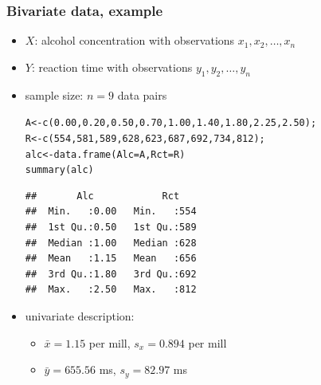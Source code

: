 \documentclass[extsize,handout,10pt]{beamer}\usepackage[]{graphicx}\usepackage[]{color}
\makeatletter
\newcommand{\hlnum}[1]{\textcolor[rgb]{0.502,0.086,1}{#1}}%
\newcommand{\hlstd}[1]{\textcolor[rgb]{0.251,0.251,0.251}{#1}}%
\newcommand{\hlkwb}[1]{\textcolor[rgb]{0,0.439,0.902}{#1}}%
\newcommand{\hlkwc}[1]{\textcolor[rgb]{0.188,0.941,0.314}{#1}}%
\newcommand{\hlkwd}[1]{\textcolor[rgb]{0.69,0.188,0.941}{#1}}%
\newenvironment{kframe}{%
 \def\at@end@of@kframe{}%
 \ifinner\ifhmode%
  \def\at@end@of@kframe{\end{minipage}}%
  \begin{minipage}{\columnwidth}%
 \fi\fi%
 \def\FrameCommand##1{\hskip\@totalleftmargin \hskip-\fboxsep
 \colorbox{shadecolor}{##1}\hskip-\fboxsep
     \hskip-\linewidth \hskip-\@totalleftmargin \hskip\columnwidth}%
 \MakeFramed {\advance\hsize-\width
   \@totalleftmargin\z@ \linewidth\hsize
   \@setminipage}}%
 {\par\unskip\endMakeFramed%
 \at@end@of@kframe}
\newenvironment{knitrout}{}{} %
\makeatother
\begin{document}
\begin{frame}[containsverbatim]
  \frametitle{Bivariate data, example}
  \begin{itemize}
  \item<3-> $X$: \alert{alcohol concentration} with observations
    $x_1,x_2,\ldots, x_n$
  \item $Y$: \alert{reaction time} with observations
    $y_1,y_2,\ldots, y_n$
  \item<4-> sample size: $n=9$ \alert{data pairs}

\scriptsize    
\begin{knitrout}\tiny
{}\color{fgcolor}\begin{kframe}
\begin{alltt}
\hlstd{A} \hlkwb{<-} \hlkwd{c}\hlstd{(}\hlnum{0.00}\hlstd{,} \hlnum{0.20}\hlstd{,} \hlnum{0.50}\hlstd{,} \hlnum{0.70}\hlstd{,} \hlnum{1.00}\hlstd{,} \hlnum{1.40}\hlstd{,} \hlnum{1.80}\hlstd{,} \hlnum{2.25}\hlstd{,} \hlnum{2.50}\hlstd{);}
\hlstd{R} \hlkwb{<-} \hlkwd{c}\hlstd{(}\hlnum{554}\hlstd{,} \hlnum{581}\hlstd{,} \hlnum{589}\hlstd{,} \hlnum{628}\hlstd{,} \hlnum{623}\hlstd{,} \hlnum{687}\hlstd{,} \hlnum{692}\hlstd{,} \hlnum{734}\hlstd{,} \hlnum{812}\hlstd{);}
\hlstd{alc} \hlkwb{<-} \hlkwd{data.frame}\hlstd{(}\hlkwc{Alc}\hlstd{=A,}\hlkwc{Rct}\hlstd{=R)}
\hlkwd{summary}\hlstd{(alc)}
\end{alltt}
\begin{verbatim}
##       Alc            Rct     
##  Min.   :0.00   Min.   :554  
##  1st Qu.:0.50   1st Qu.:589  
##  Median :1.00   Median :628  
##  Mean   :1.15   Mean   :656  
##  3rd Qu.:1.80   3rd Qu.:692  
##  Max.   :2.50   Max.   :812
\end{verbatim}
\end{kframe}
\end{knitrout}
    
\item<5-> univariate description:
  \begin{itemize}
  \item $\bar{x}=1.15$ per mill, $s_x=0.894$ per mill
  \item $\bar{y}=655.56$ ms, $s_y=82.97$ ms
  \end{itemize}
\end{itemize}
\end{frame}
\end{document}
